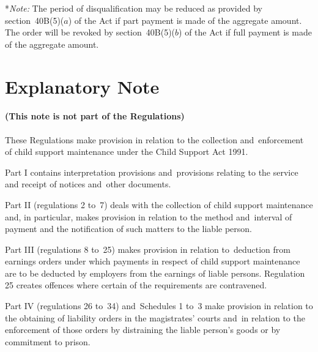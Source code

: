 \documentclass[12pt,a4paper]{article}
\begin{document}
\medskip

*\emph{Note:} The period of disqualification may be reduced as provided by section~40B(5)($a$) of the Act if part payment is made of the aggregate amount.  The order will be revoked by section~40B(5)($b$) of the Act if full payment is made of the aggregate amount.

\part{Explanatory Note}

\renewcommand\parthead{--- Explanatory Note}

\subsection*{(This note is not part of the Regulations)}

 These Regulations make provision in relation to the collection and~enforcement of child support maintenance under the Child Support Act 1991.

  Part I contains interpretation provisions and~provisions relating to the service and receipt of notices and~other documents.

  Part II (regulations 2 to~7) deals with the collection of child support maintenance and, in particular, makes provision in relation to the method and~interval of payment and the notification of such matters to the liable person.

  Part III (regulations 8 to~25) makes provision in relation to~deduction from earnings orders under which payments in respect of child support maintenance are to be deducted by employers from the earnings of liable persons. Regulation 25 creates offences where certain of the requirements are contravened.

  Part IV (regulations 26 to~34) and~Schedules 1 to~3 make provision in relation to the obtaining of liability orders in the magistrates' courts and~in relation to the enforcement of those orders by distraining the liable person’s goods or by commitment to prison.
\end{document}
